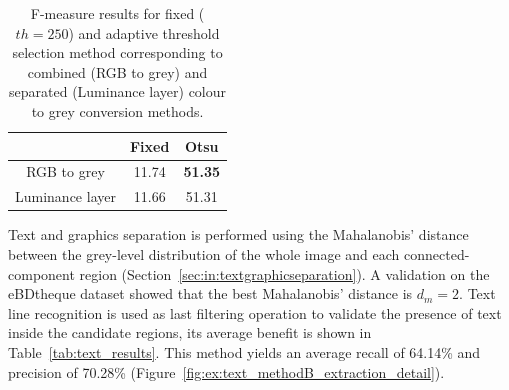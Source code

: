  \begin{table}[ht]
    \centering
    \caption[F-measure results for fixed and adaptive threshold selection method corresponding to combined and separated colour to grey conversion methods]{F-measure results for fixed ($th=250$) and adaptive threshold selection method corresponding to combined (RGB to grey) and separated (Luminance layer) colour to grey conversion methods.}
    \begin{tabular}{|c|c|c|}
      \hline
       & Fixed & Otsu \\ 
      \hline
      RGB to grey & 11.74 & \textbf{51.35}  \\ 
      \hline
      Luminance layer & 11.66 & 51.31 \\ 
      \hline
    \end{tabular}
    \label{fig:ex:text_extraction_methodB_segmentation}
  \end{table}%


Text and graphics separation is performed using the Mahalanobis' distance between the grey-level distribution of the whole image and each connected-component region (Section~\ref{sec:in:textgraphicseparation}).
A validation on the eBDtheque dataset showed that the best Mahalanobis' distance is $d_m=2$.
Text line recognition is used as last filtering operation to validate the presence of text inside the candidate regions, its average benefit is shown in Table~\ref{tab:text_results}.
This method yields an average recall of 64.14\% and precision of 70.28\% (Figure~\ref{fig:ex:text_methodB_extraction_detail}).

